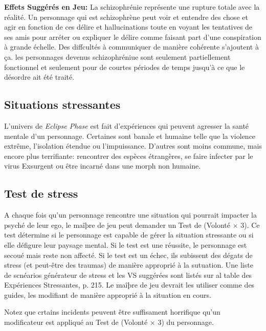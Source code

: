 \textbf{Effets Suggérés en Jeu:} La schizophrénie représente une rupture totale avec la réalité. Un personnage qui est schizophrène peut voir et entendre des chose et agir en fonction de ces délire et hallucinations toute en voyant les tentatives de ses amis pour arréter ou expliquer le délire comme faisant part d'une conspiration à grande échelle. Des diffcultés à communiquer de manière cohérente s'ajoutent à ça. les personnages devenus schizophréniue sont seulement partiellement fonctionnel et seulement pour de courtes périodes de temps jusqu'à ce que le désordre ait été traité. 



\subsection{Situations stressantes} \label{sec:stressful-situations} 

L'univers de \emph{Eclipse Phase } est fait d'expériences qui peuvent agresser la santé mentale d'un personnage. Certaines sont banale et humaine telle que la violence extrême, l'isolation étendue ou l'impuissance. D'autres sont moins commune, mais encore plus terrifiante: rencontrer des espèces étrangères, se faire infecter par le virus Exsurgent ou être incarné dans une morph non humaine. 



\subsection{Test de stress} \label{sec:willpower-stress-tests} 

A chaque fois qu'un personnage rencontre une situation qui pourrait impacter la psyché de leur ego, le maîþre de jeu peut demander un Test de (Volonté $\times$ 3). Ce test détermine si le personnage est capable de gérer la situation stressante ou si elle défigure leur paysage mental. Si le test est une réussite, le personnage est secoué mais reste non affecté. Si le test est un échec, ils subissent des dégats de stress (et peut-être des traumas) de manière approprié à la sutuation. Une liste de scnéarios générateur de stress et les VS suggérées sont listés sur al table des Expériences Stressantes, p. 215. Le maîþre de jeu devrait les utiliser comme des guides, les modifiant de manière approprié à la situation en cours. 

Notez que crtains incidents peuvent être suffisament horrifique qu'un modificateur est appliqué au Test de (Volonté $\times$ 3) du personnage. 

